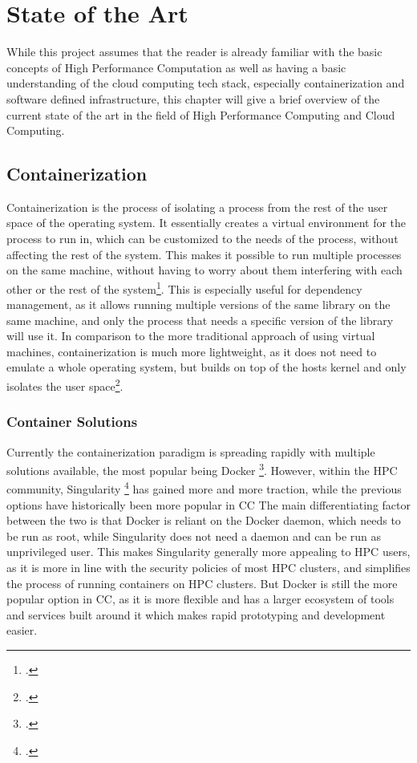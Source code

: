 \chapter{State of the Art}
\label{State_of_the_Art}

While this project assumes that the reader is already familiar with the basic concepts of High Performance Computation
as well as having a basic understanding of the cloud computing tech stack, especially containerization and software defined infrastructure,
this chapter will give a brief overview of the current state of the art in the field of High Performance Computing and Cloud Computing.

\section{Containerization}

Containerization is the process of isolating a process from the rest of the user space of the operating system.
It essentially creates a virtual environment for the process to run in, which can be customized to the needs of the process, without affecting the rest of the system.
This makes it possible to run multiple processes on the same machine, without having to worry about them interfering with each other or the rest of the system\footcite{IEEEXploreFullText}.
This is especially useful for dependency management, as it allows running multiple versions of the same library on the same machine, and only the process that needs a specific version of the library will use it.
In comparison to the more traditional approach of using virtual machines, containerization is much more lightweight, as it does not need to emulate a whole operating system, 
but builds on top of the hosts kernel and only isolates the user space\footcite{WhatContainerDocker}.

\subsection*{Container Solutions}

Currently the containerization paradigm is spreading rapidly with multiple solutions available, the most popular being Docker \footcite{StackOverflowDeveloper}.
However, within the \ac{HPC} community, Singularity \footcite{IntroductionSoftwareContainers} has gained more and more traction, while the previous options have historically been more popular in \ac{CC}
The main differentiating factor between the two is that Docker is reliant on the Docker daemon, which needs to be run as root, while Singularity does not need a daemon and can be run as unprivileged user.
This makes Singularity generally more appealing to \ac{HPC} users, as it is more in line with the security policies of most \ac{HPC} clusters, and simplifies the process of running containers on \ac{HPC} clusters.
But Docker is still the more popular option in \ac{CC}, as it is more flexible and has a larger ecosystem of tools and services built around it which makes rapid prototyping and development easier.

